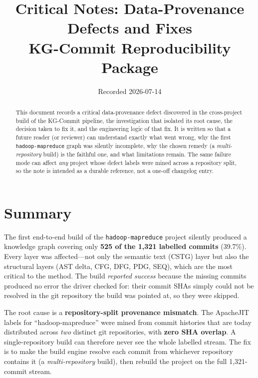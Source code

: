 \documentclass[11pt]{article}
\title{\textbf{Critical Notes: Data-Provenance Defects and Fixes}\\[0.4em]
       \large KG-Commit Reproducibility Package}
\author{}
\date{Recorded 2026-07-14}
\newcommand{\code}[1]{\texttt{#1}}
\begin{document}
\maketitle

\begin{abstract}
This document records a critical data-provenance defect discovered in the
cross-project build of the KG-Commit pipeline, the investigation that isolated
its root cause, the decision taken to fix it, and the engineering logic of that
fix. It is written so that a future reader (or reviewer) can understand exactly
what went wrong, why the first \code{hadoop-mapreduce} graph was silently
incomplete, why the chosen remedy (a \emph{multi-repository} build) is the
faithful one, and what limitations remain. The same failure mode can affect
\emph{any} project whose defect labels were mined across a repository split, so
the note is intended as a durable reference, not a one-off changelog entry.
\end{abstract}

\tableofcontents

\section{Summary}
The first end-to-end build of the \code{hadoop-mapreduce} project silently
produced a knowledge graph covering only \textbf{525 of the 1{,}321 labelled
commits} (39.7\%). Every layer was affected---not only the semantic text
(CSTG) layer but also the structural layers (AST delta, CFG, DFG, PDG, SEQ),
which are the most critical to the method. The build \emph{reported success}
because the missing commits produced no error the driver checked for: their
commit SHAs simply could not be resolved in the git repository the build was
pointed at, so they were skipped.

The root cause is a \textbf{repository-split provenance mismatch}. The ApacheJIT
labels for ``hadoop-mapreduce'' were mined from commit histories that are today
distributed across \emph{two} distinct git repositories, with \textbf{zero SHA
overlap}. A single-repository build can therefore never see the whole labelled
stream. The fix is to make the build engine resolve each commit from
whichever repository contains it (a \emph{multi-repository} build), then rebuild
the project on the full 1{,}321-commit stream.
\end{document}
